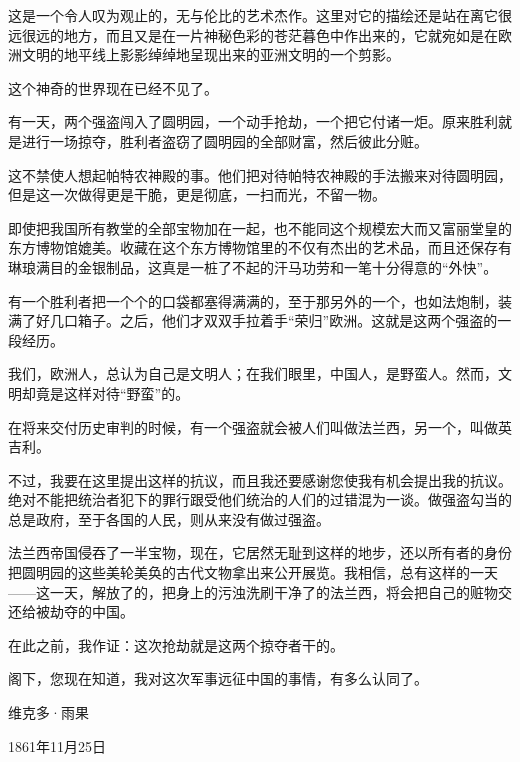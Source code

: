 \documentclass[12pt,UTF-8,openany]{ctexbook}
\begin{document}
\begin{large}
    这是一个令人叹为观止的，无与伦比的艺术杰作。这里对它的描绘还是站在离它很远很远的地方，而且又是在一片神秘色彩的苍茫暮色中作出来的，它就宛如是在欧洲文明的地平线上影影绰绰地呈现出来的亚洲文明的一个剪影。
    
    这个神奇的世界现在已经不见了。
    
    有一天，两个强盗闯入了圆明园，一个动手抢劫，一个把它付诸一炬。原来胜利就是进行一场掠夺，胜利者盗窃了圆明园的全部财富，然后彼此分赃。
    
    这不禁使人想起帕特农神殿的事。他们把对待帕特农神殿的手法搬来对待圆明园，但是这一次做得更是干脆，更是彻底，一扫而光，不留一物。
    
    即使把我国所有教堂的全部宝物加在一起，也不能同这个规模宏大而又富丽堂皇的东方博物馆媲美。收藏在这个东方博物馆里的不仅有杰出的艺术品，而且还保存有琳琅满目的金银制品，这真是一桩了不起的汗马功劳和一笔十分得意的“外快”。
    
    有一个胜利者把一个个的口袋都塞得满满的，至于那另外的一个，也如法炮制，装满了好几口箱子。之后，他们才双双手拉着手“荣归”欧洲。这就是这两个强盗的一段经历。
    
    我们，欧洲人，总认为自己是文明人；在我们眼里，中国人，是野蛮人。然而，文明却竟是这样对待“野蛮”的。
    
    在将来交付历史审判的时候，有一个强盗就会被人们叫做法兰西，另一个，叫做英吉利。
    
    不过，我要在这里提出这样的抗议，而且我还要感谢您使我有机会提出我的抗议。绝对不能把统治者犯下的罪行跟受他们统治的人们的过错混为一谈。做强盗勾当的总是政府，至于各国的人民，则从来没有做过强盗。
    
    法兰西帝国侵吞了一半宝物，现在，它居然无耻到这样的地步，还以所有者的身份把圆明园的这些美轮美奂的古代文物拿出来公开展览。我相信，总有这样的一天——这一天，解放了的，把身上的污浊洗刷干净了的法兰西，将会把自己的赃物交还给被劫夺的中国。
    
    在此之前，我作证：这次抢劫就是这两个掠夺者干的。
    
    阁下，您现在知道，我对这次军事远征中国的事情，有多么认同了。
    
    \vspace{36pt}
    
    \begin{flushright}
        维克多·雨果
        
        1861年11月25日
        
    \end{flushright}
    
    
    
\end{large}
\end{document}
